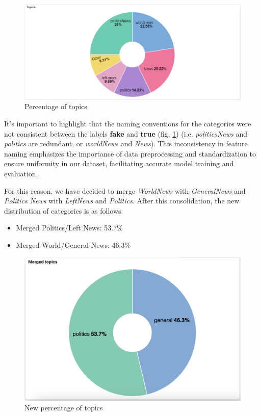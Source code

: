 \newpage

\begin{figure}[h]
  \centering
  \includegraphics[width=1.0\linewidth]{Images/kibana_2.png}
  \caption{Percentage of topics}
  \label{fig:kibana_2}
\end{figure}

It's important to highlight that the naming conventions for the categories were not consistent between the labels \textbf{fake} and \textbf{true} (fig. \ref{fig:kibana_2}) (i.e. \textit{politicsNews} and \textit{politics} are redundant, or \textit{worldNews} and \textit{News}). This inconsistency in feature naming emphasizes the importance of data preprocessing and standardization to ensure uniformity in our dataset, facilitating accurate model training and evaluation.

For this reason, we have decided to merge \textit{WorldNews} with \textit{GeneralNews} and \textit{Politics News} with \textit{LeftNews} and \textit{Politics}. After this consolidation, the new distribution of categories is as follows:
\begin{itemize}
  \item Merged Politics/Left News: 53.7\%
  \item Merged World/General News: 46.3\%
\end{itemize}

\begin{figure}[h]
  \centering
  \includegraphics[width=1.0\linewidth]{Images/kibana_6.png}
  \caption{New percentage of topics}
  \label{fig:kibana_6}
\end{figure}

